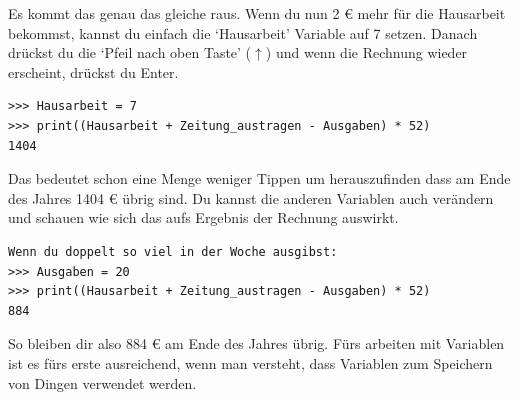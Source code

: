 Es kommt das genau das gleiche raus. Wenn du nun 2 € mehr für die Hausarbeit bekommst, kannst du einfach die `Hausarbeit' Variable auf 7 setzen. Danach drückst du die `Pfeil nach oben Taste' ($\uparrow$) und wenn die Rechnung wieder erscheint, drückst du Enter.

\begin{Verbatim}[frame=single]
>>> Hausarbeit = 7
>>> print((Hausarbeit + Zeitung_austragen - Ausgaben) * 52)
1404
\end{Verbatim}

Das bedeutet schon eine Menge weniger Tippen um herauszufinden dass am Ende des Jahres 1404 € übrig sind. Du kannst die anderen Variablen auch verändern und schauen wie sich das aufs Ergebnis der Rechnung auswirkt.

\begin{Verbatim}[frame=single]
Wenn du doppelt so viel in der Woche ausgibst:
>>> Ausgaben = 20
>>> print((Hausarbeit + Zeitung_austragen - Ausgaben) * 52)
884
\end{Verbatim}

So bleiben dir also 884 € am Ende des Jahres übrig. Fürs arbeiten mit Variablen ist es fürs erste ausreichend, wenn man versteht, dass Variablen zum Speichern von Dingen verwendet werden.

